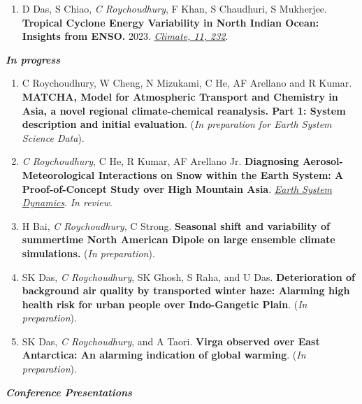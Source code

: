 \documentclass[margin,line]{resume}
\begin{document}
\begin{resume}
\begin{enumerate}[topsep=1pt, partopsep=1pt, itemsep=0.5pt, parsep=0.1pt, leftmargin=15pt,label=\arabic*.]
			\item D Das, S Chiao, \textit{C Roychoudhury}, F Khan, S Chaudhuri, S Mukherjee. \textbf{Tropical Cyclone Energy Variability in North Indian Ocean: Insights from ENSO.} 2023.
			\href{https://www.mdpi.com/2225-1154/11/12/232}{\textit{Climate, 11, 232}}.
			
		\end{enumerate}
	
		\textbf{\emph{\textcolor{sep}{In progress}}}
			\begin{enumerate}[topsep=1pt, partopsep=1pt, itemsep=0.5pt, parsep=0.1pt, leftmargin=15pt,label=\arabic*.]
				
			\item C Roychoudhury, W Cheng, N Mizukami, C He, AF Arellano and R Kumar. \textbf{MATCHA, Model for Atmospheric Transport and Chemistry in Asia, a novel regional climate-chemical reanalysis. Part 1: System description and initial evaluation}. (\textit{In preparation for Earth System Science Data}).
	
			\item \textit{C Roychoudhury}, C He, R Kumar, AF Arellano Jr. \textbf{Diagnosing Aerosol-Meteorological Interactions on Snow within the Earth System: A Proof-of-Concept Study over High Mountain Asia}.  \emph{\href{https://doi.org/10.5194/egusphere-2024-2298}{Earth System Dynamics}}. \textit{In review}.
			
			\item H Bai, \textit{C Roychoudhury}, C Strong. \textbf{Seasonal shift and variability of summertime North American Dipole on large ensemble climate simulations.} (\emph{In preparation}).
			
			\item   SK Das, \textit{C Roychoudhury}, SK Ghosh, S Raha, and U Das.
			\textbf{ Deterioration of background air quality by transported winter haze: Alarming high health risk for urban people over Indo-Gangetic Plain}. (\emph{In preparation}).
			
			\item SK Das, \textit{C Roychoudhury}, and A Taori.
			\textbf{Virga observed over East Antarctica: An alarming indication of global warming}. (\emph{In preparation}).
			
			
		\end{enumerate}
		
	
	\textbf{\emph{\textcolor{sep}{Conference Presentations}}}
		\begin{enumerate}[topsep=1pt, partopsep=1pt, itemsep=0.5pt, parsep=0.1pt, leftmargin=15pt,label=\arabic*.]
			

\end{enumerate}
\end{resume}
\end{document}
